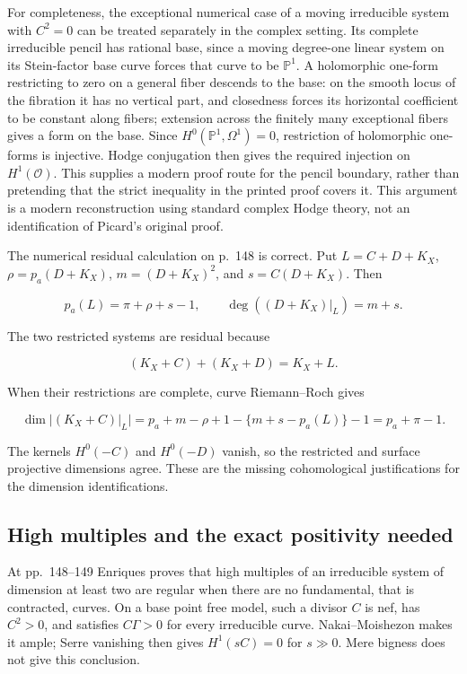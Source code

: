 For completeness, the exceptional numerical case of a moving irreducible system with \(C^2=0\) can be treated separately in the complex setting. Its complete irreducible pencil has rational base, since a moving degree-one linear system on its Stein-factor base curve forces that curve to be \(\mathbb P^1\). A holomorphic one-form restricting to zero on a general fiber descends to the base: on the smooth locus of the fibration it has no vertical part, and closedness forces its horizontal coefficient to be constant along fibers; extension across the finitely many exceptional fibers gives a form on the base. Since \(H^0(\mathbb P^1,\Omega^1)=0\), restriction of holomorphic one-forms is injective. Hodge conjugation then gives the required injection on \(H^1(\mathcal O)\). This supplies a modern proof route for the pencil boundary, rather than pretending that the strict inequality in the printed proof covers it. This argument is a modern reconstruction using standard complex Hodge theory, not an identification of Picard's original proof.

The numerical residual calculation on p.~148 is correct. Put \(L=C+D+K_X\), \(\rho=p_a(D+K_X)\), \(m=(D+K_X)^2\), and \(s=C(D+K_X)\). Then

\[
p_a(L)=\pi+\rho+s-1,\qquad
\deg((D+K_X)|_L)=m+s.
\]

The two restricted systems are residual because

\[
(K_X+C)+(K_X+D)=K_X+L.
\]

When their restrictions are complete, curve Riemann--Roch gives

\[
\dim|(K_X+C)|_L|
=p_a+m-\rho+1-\{m+s-p_a(L)\}-1
=p_a+\pi-1.
\]

The kernels \(H^0(-C)\) and \(H^0(-D)\) vanish, so the restricted and surface projective dimensions agree. These are the missing cohomological justifications for the dimension identifications.

\subsection{High multiples and the exact positivity needed}

At pp.~148--149 Enriques proves that high multiples of an irreducible system of dimension at least two are regular when there are no fundamental, that is contracted, curves. On a base point free model, such a divisor \(C\) is nef, has \(C^2>0\), and satisfies \(C\Gamma>0\) for every irreducible curve. Nakai--Moishezon makes it ample; Serre vanishing then gives \(H^1(sC)=0\) for \(s\gg0\). Mere bigness does not give this conclusion.

